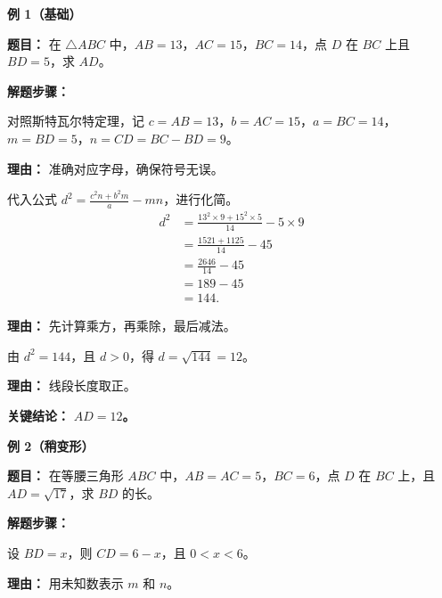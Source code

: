 \begin{examplebox}

	\textbf{\textcolor{CExample}{例 1（基础）}}

	\textbf{\textcolor{CExample}{题目：}}
	在 $\triangle ABC$ 中，$AB=13$，$AC=15$，$BC=14$，点 $D$ 在 $BC$ 上且 $BD=5$，求 $AD$。

	\textbf{\textcolor{CExample}{解题步骤：}}
	\begin{description}[style=nextline, leftmargin=2.8em, labelsep=0.5em, itemsep=0.45em]
		\item[\textbf{第一步（确认变量）：}] 对照斯特瓦尔特定理，记 $c=AB=13$，$b=AC=15$，$a=BC=14$，$m=BD=5$，$n=CD=BC-BD=9$。
			\par\textbf{理由：} 准确对应字母，确保符号无误。

		\item[\textbf{第二步（代入公式并计算）：}] 代入公式 $d^{2} = \frac{c^{2}n + b^{2}m}{a} - mn$，进行化简。
			\[
				\begin{aligned}
					d^{2} &= \frac{13^{2}\times 9 + 15^{2}\times 5}{14} - 5\times 9 \\
					&= \frac{1521 + 1125}{14} - 45 \\
					&= \frac{2646}{14} - 45 \\
					&= 189 - 45 \\
					&= 144.
			\end{aligned}
			\]
			\par\textbf{理由：} 先计算乘方，再乘除，最后减法。

		\item[\textbf{第三步（开平方求 $AD$）：}] 由 $d^{2}=144$，且 $d>0$，得 $d=\sqrt{144}=12$。
			\par\textbf{理由：} 线段长度取正。
	\end{description}

	\textbf{\textcolor{CExample}{关键结论：}}
	\textbf{$AD=12$。}

	\medskip
	\textbf{\textcolor{CExample}{例 2（稍变形）}}

	\textbf{\textcolor{CExample}{题目：}}
	在等腰三角形 $ABC$ 中，$AB=AC=5$，$BC=6$，点 $D$ 在 $BC$ 上，且 $AD=\sqrt{17}$，求 $BD$ 的长。

	\textbf{\textcolor{CExample}{解题步骤：}}
	\begin{description}[style=nextline, leftmargin=2.8em, labelsep=0.5em, itemsep=0.45em]
		\item[\textbf{第一步（设未知数）：}] 设 $BD=x$，则 $CD=6-x$，且 $0<x<6$。
			\par\textbf{理由：} 用未知数表示 $m$ 和 $n$。


\end{description}
\end{examplebox}
